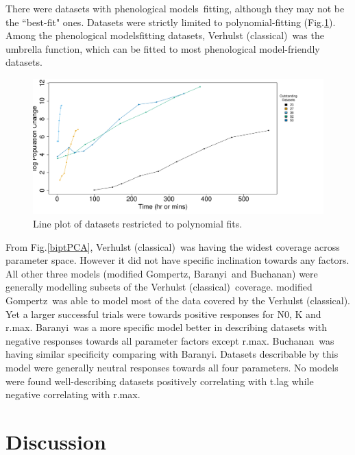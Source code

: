 \documentclass[a4paper, 11pt]{article}
\newcommand{\pml}{phenological model}
\newcommand{\pms}{phenological models}
\newcommand{\fve}{Verhulst (classical)}
\newcommand{\fgo}{modified Gompertz}
\newcommand{\fba}{Baranyi}
\newcommand{\fbu}{Buchanan}
\begin{document}
 There were 
  datasets with \pms\ fitting, although they may not be the ``best-fit" ones.  Datasets 
  were strictly limited to polynomial-fitting (Fig.\ref{lineOut}).  Among the \pms fitting datasets, \fve\ was the umbrella function, which can be fitted to most \pml-friendly datasets.
 \begin{figure}[H]
 	\centering
 	\includegraphics[width=\linewidth]{../results/Log_outstanding.pdf}
 	\caption{Line plot of datasets restricted to polynomial fits.}\label{lineOut}
 \end{figure}
From Fig.\ref{biptPCA}, \fve\ was having the widest coverage across parameter space.  However it did not have specific inclination towards any factors.  All other three models (\fgo, \fba\ and \fbu) were generally modelling subsets of the \fve\ coverage.  \fgo\ was able to model most of the data covered by the \fve.  Yet a larger successful trials were towards positive responses for N0, K and r.max.  \fba\ was a more specific model better in describing datasets with negative responses towards all parameter factors except r.max.  \fbu\ was having similar specificity comparing with \fba.  Datasets describable by this model were generally neutral responses towards all four parameters.  No models were found well-describing datasets positively correlating with t.lag while negative correlating with r.max.
	
	\section*{Discussion}
	
\end{document}

